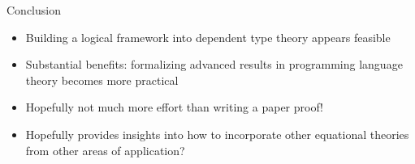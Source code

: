 \documentclass[usenames,dvipsnames]{beamer}
\begin{document}

\begin{frame}{Conclusion}
\begin{itemize}
\item Building a logical framework into dependent type theory appears feasible
\item Substantial benefits: formalizing advanced results in programming language theory becomes more practical
\item Hopefully not much more effort than writing a paper proof!
\item Hopefully provides insights into how to incorporate other equational theories from other areas of application?
\end{itemize}
\end{frame}
\end{document}
